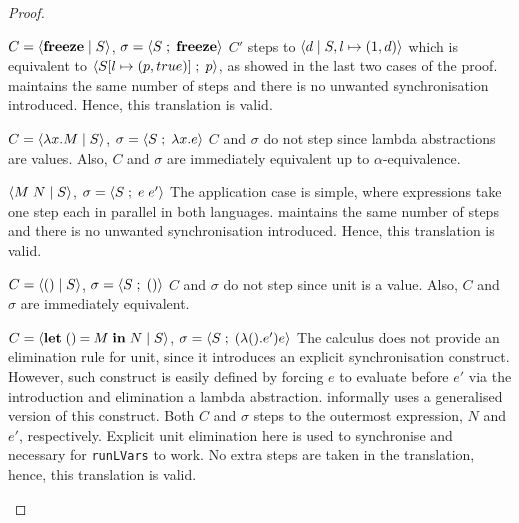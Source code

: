 \documentclass[main.tex]{subfiles}
\begin{document}
\begin{proof}
  \begin{case}{%
      $C = \langle {\ensuremath{\mathbf{freeze}}}\;\vert\;{S} \rangle$,
      $\sigma = \langle {S} \; ; \;{\mathbf{freeze}} \rangle$}
    $C'$ steps to $\langle {d}\;\vert\;{S, l \mapsto (1, d)} \rangle$ which is equivalent to $\langle {S[l \mapsto (p, true)]} \; ; \;{p} \rangle$, as showed in the last two cases of the proof. \typedlambdalvar maintains the same number of steps and there is no unwanted synchronisation introduced. Hence, this translation is valid.
  \end{case}

  \begin{case}{%
      $C = \langle {\lambda x.M}\;\vert\;{S} \rangle$,
      $\sigma = \langle {S} \; ; \;{\lambda x.e} \rangle$}
    $C$ and $\sigma$ do not step since lambda abstractions are values. Also, $C$ and $\sigma$ are immediately equivalent up to $\alpha$-equivalence.
  \end{case}

  \begin{case}{%
      $\langle {M\;N}\;\vert\;{S} \rangle$,
      $ \sigma = \langle {S} \; ; \;{e\;e'} \rangle$}
    The application case is simple, where expressions take one step each in parallel in both languages. \typedlambdalvar maintains the same number of steps and there is no unwanted synchronisation introduced. Hence, this translation is valid.
  \end{case}

  \begin{case}{%
      $ C = \langle {()}\;\vert\;{S} \rangle$,
      $\sigma = \langle {S} \; ; \;{()} \rangle$}
    $C$ and $\sigma$ do not step since unit is a value. Also, $C$ and $\sigma$ are immediately equivalent.
  \end{case}

  \begin{case}{%
      $ C = \langle {\ensuremath{\mathbf{let}\;()\mathbin{=}M\;\mathbf{in}\;N}}\;\vert\;{S} \rangle$,
      $\sigma = \langle {S} \; ; \;{(\lambda (). e')  e} \rangle$}
    The \lambdalvar calculus does not provide an elimination rule for unit, since it introduces an explicit synchronisation construct. However, such construct is easily defined by forcing $e$ to evaluate before $e'$ via the introduction and elimination a lambda abstraction. \citet{kuper15} informally uses a generalised version of this construct. Both $C$ and $\sigma$ steps to the outermost expression, $N$ and $e'$, respectively. Explicit unit elimination here is used to synchronise and necessary for \texttt{runLVars} to work. No extra steps are taken in the translation, hence, this translation is valid.
  \end{case}


\end{proof}
\end{document}
